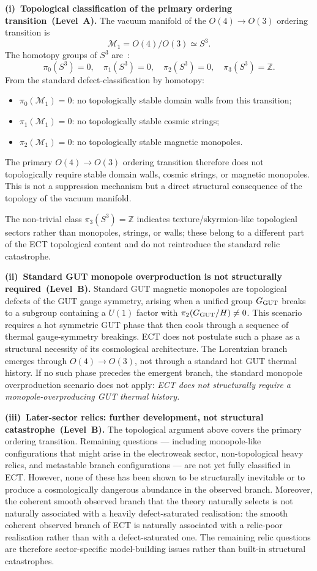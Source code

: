 \documentclass[11pt,a4paper]{article}
\numberwithin{equation}{section}
\begin{document}
\textbf{(i)~Topological classification of the primary ordering
transition~(Level~A).}
The vacuum manifold of the $O(4)\to O(3)$ ordering transition is
\[
\mathcal{M}_1 = O(4)/O(3) \simeq S^3.
\]
The homotopy groups of $S^3$ are~\cite{Nakahara2003}:
\[
\pi_0(S^3)=0,\quad
\pi_1(S^3)=0,\quad
\pi_2(S^3)=0,\quad
\pi_3(S^3)=\mathbb{Z}.
\]
From the standard defect-classification by homotopy:
\begin{itemize}
  \item $\pi_0(\mathcal{M}_1)=0$: no topologically stable domain walls
    from this transition;
  \item $\pi_1(\mathcal{M}_1)=0$: no topologically stable cosmic strings;
  \item $\pi_2(\mathcal{M}_1)=0$: no topologically stable magnetic monopoles.
\end{itemize}
The primary $O(4)\to O(3)$ ordering transition therefore does not
topologically require stable domain walls, cosmic strings, or magnetic
monopoles.
This is not a suppression mechanism but a direct structural consequence
of the topology of the vacuum manifold.

The non-trivial class $\pi_3(S^3)=\mathbb{Z}$ indicates texture/skyrmion-like
topological sectors rather than monopoles, strings, or walls; these belong
to a different part of the ECT topological content and do not reintroduce
the standard relic catastrophe.

\textbf{(ii)~Standard GUT monopole overproduction is not structurally
required~(Level~B).}
Standard GUT magnetic monopoles are topological defects of the GUT gauge
symmetry, arising when a unified group $G_{\rm GUT}$ breaks to a subgroup
containing a $U(1)$ factor with $\pi_2(G_{\rm GUT}/H)\neq 0$.
This scenario requires a hot symmetric GUT phase that then cools through a
sequence of thermal gauge-symmetry breakings.
ECT does not postulate such a phase as a structural necessity of its
cosmological architecture.
The Lorentzian branch emerges through $O(4)\to O(3)$, not through a
standard hot GUT thermal history.
If no such phase precedes the emergent branch, the standard monopole
overproduction scenario does not apply:
\emph{ECT does not structurally require a monopole-overproducing GUT
thermal history.}

\textbf{(iii)~Later-sector relics: further development, not structural
catastrophe~(Level~B).}
The topological argument above covers the primary ordering transition.
Remaining questions --- including monopole-like configurations that might
arise in the electroweak sector, non-topological heavy relics, and
metastable branch configurations --- are not yet fully classified in ECT.
However, none of these has been shown to be structurally inevitable or to
produce a cosmologically dangerous abundance in the observed branch.
Moreover, the coherent smooth observed branch that the theory naturally
selects is not naturally associated with a heavily defect-saturated
realisation:
the smooth coherent observed branch of ECT is naturally associated with a
relic-poor realisation rather than with a defect-saturated one.
The remaining relic questions are therefore sector-specific model-building
issues rather than built-in structural catastrophes.
\end{document}
